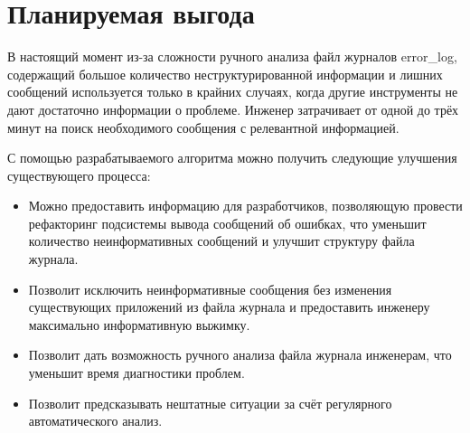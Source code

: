 \section{Планируемая выгода}

В настоящий момент из-за сложности ручного анализа файл журналов error\_log,
содержащий большое количество неструктурированной информации и
лишних сообщений используется только в крайних случаях, когда другие
инструменты не дают достаточно информации о проблеме. Инженер затрачивает
от одной до трёх минут на поиск необходимого сообщения с релевантной
информацией.

С помощью разрабатываемого алгоритма можно получить следующие улучшения
существующего процесса:

\begin{itemize}
  \item Можно предоставить информацию для разработчиков, позволяющую провести
    рефакторинг подсистемы вывода сообщений об ошибках, что уменьшит
    количество неинформативных сообщений и улучшит структуру файла журнала.
  \item Позволит исключить неинформативные сообщения без изменения существующих
    приложений из файла журнала и предоставить инженеру максимально
    информативную выжимку.
  \item Позволит дать возможность ручного анализа файла журнала инженерам,
    что уменьшит время диагностики проблем.
  \item Позволит предсказывать нештатные ситуации за счёт регулярного
    автоматического анализ.
\end{itemize}
